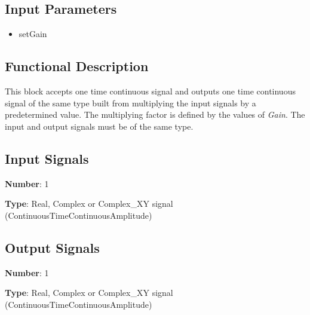 \documentclass[../../sdf/tex/BPSK_system.tex]{subfiles}
\date{ }
\begin{document}
\onlyinsubfile{\maketitle}

\subsection*{Input Parameters}

\begin{multicols}{2}
	\begin{itemize}
		\item setGain
	\end{itemize}
\end{multicols}

\subsection*{Functional Description}

This block accepts one time continuous signal and outputs one time continuous signal of the same type built from multiplying the input signals by a predetermined value. The multiplying factor is defined by the values of \textit{Gain}. The input and output signals must be of the same type.

\subsection*{Input Signals}

\textbf{Number}: 1

\textbf{Type}: Real, Complex or Complex\_XY signal (ContinuousTimeContinuousAmplitude)

\subsection*{Output Signals}

\textbf{Number}: 1

\textbf{Type}: Real, Complex or Complex\_XY signal (ContinuousTimeContinuousAmplitude)
\end{document}
